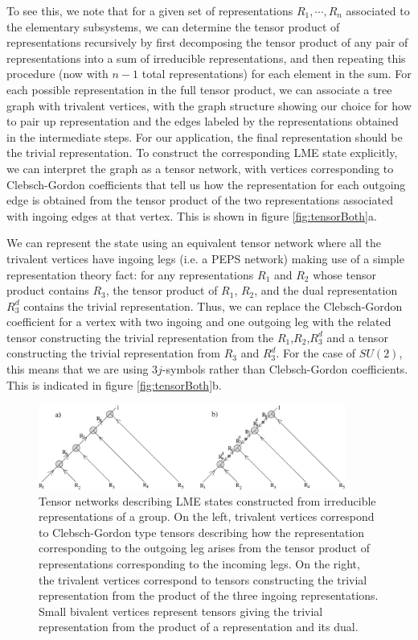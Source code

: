 \documentclass[12pt]{article}
\theoremstyle{definition}
\begin{document}
To see this, we note that for a given set of representations $R_1, \cdots, R_n$ associated to the elementary subsystems, we can determine the tensor product of representations recursively by first decomposing the tensor product of any pair of representations into a sum of irreducible representations, and then repeating this procedure (now with $n-1$ total representations) for each element in the sum. For each possible representation in the full tensor product, we can associate a tree graph with trivalent vertices, with the graph structure showing our choice for how to pair up representation and the edges labeled by the representations obtained in the intermediate steps. For our application, the final representation should be the trivial representation. To construct the corresponding LME state explicitly, we can interpret the graph as a tensor network, with vertices corresponding to Clebsch-Gordon coefficients that tell us how the representation for each outgoing edge is obtained from the tensor product of the two representations associated with ingoing edges at that vertex. This is shown in figure \ref{fig:tensorBoth}a.

We can represent the state using an equivalent tensor network where all the trivalent vertices have ingoing legs (i.e. a PEPS network) making use of a simple representation theory fact: for any representations $R_1$ and $R_2$ whose tensor product contains $R_3$, the tensor product of $R_1$, $R_2$, and the dual representation $R_3^d$ contains the trivial representation. Thus, we can replace the Clebsch-Gordon coefficient for a vertex with two ingoing and one outgoing leg with the related tensor constructing the trivial representation from the $R_1$,$R_2$,$R_3^d$ and a tensor constructing the trivial representation from $R_3$ and $R_3^d$. For the case of $SU(2)$, this means that we are using $3j$-symbols rather than Clebsch-Gordon coefficients. This is indicated in figure \ref{fig:tensorBoth}b.

\begin{figure}
\centering
\includegraphics[width=0.9\textwidth]{tensorBoth.eps}
\caption{Tensor networks describing LME states constructed from irreducible representations of a group. On the left, trivalent vertices correspond to Clebsch-Gordon type tensors describing how the representation corresponding to the outgoing leg arises from the tensor product of representations corresponding to the incoming legs. On the right, the trivalent vertices correspond to tensors constructing the trivial representation from the product of the three ingoing representations. Small bivalent vertices represent tensors giving the trivial representation from the product of a representation and its dual.}
\label{tensorBoth}
\end{figure}
\end{document}
